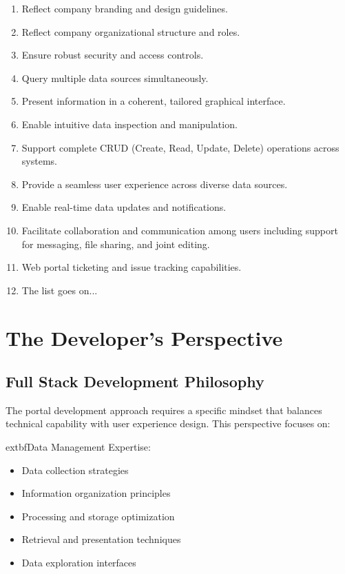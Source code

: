 \begin{enumerate}
\item Reflect company branding and design guidelines.
\item Reflect company organizational structure and roles.
\item Ensure robust security and access controls.
\item Query multiple data sources simultaneously.
\item Present information in a coherent, tailored graphical interface.
\item Enable intuitive data inspection and manipulation.
\item Support complete CRUD (Create, Read, Update, Delete) operations across systems.
\item Provide a seamless user experience across diverse data sources.
\item Enable real-time data updates and notifications.
\item Facilitate collaboration and communication among users including support for messaging, file sharing, and joint editing.
\item Web portal ticketing and issue tracking capabilities.
\item The list goes on...
\end{enumerate}


\section{The Developer's Perspective}

\subsection{Full Stack Development Philosophy}

The portal development approach requires a specific mindset that balances technical capability with user experience design. This perspective focuses on:

	extbf{Data Management Expertise:}
\begin{itemize}
\item Data collection strategies
\item Information organization principles
\item Processing and storage optimization
\item Retrieval and presentation techniques
\item Data exploration interfaces
\end{itemize}

